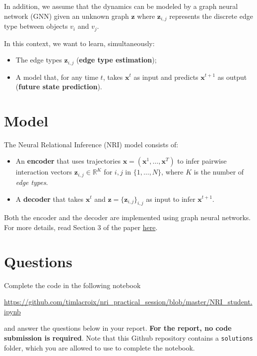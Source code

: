 \documentclass[a4paper, 11pt]{article}
\begin{document}
In addition,  we assume that the dynamics can be modeled by a graph neural network (GNN) given an unknown graph $\mathbf{z}$ where $\mathbf{z}_{i,j}$ represents the discrete edge type between objects $v_i$ and $v_j$.

In this context, we want to learn, simultaneously:

\begin{itemize}
	\item The edge types $\mathbf{z}_{i,j}$ (\textbf{edge type estimation}); 
	\item A model that, for any time $t$, takes $\mathbf{x}^t$ as input and predicts $\mathbf{x}^{t+1}$ as output (\textbf{future state prediction}).
\end{itemize}

\section{Model}

The Neural Relational Inference (NRI) model consists of:

\begin{itemize}
	\item An \textbf{encoder} that uses trajectories $\mathbf{x} = (\mathbf{x}^1, \ldots, \mathbf{x}^T)$ to infer pairwise interaction vectors $\mathbf{z}_{i, j} \in \mathbb{R}^K$ for $i, j$ in $\{1, \ldots, N \}$, where $K$ is the number of \emph{edge types}.
	\item A \textbf{decoder} that takes $\mathbf{x}^t$ and $\mathbf{z} = \{\mathbf{z}_{i, j}\}_{i,j}$ as input to infer $\mathbf{x}^{t+1}$.
\end{itemize}

Both the encoder and the decoder are implemented using graph neural networks. For more details, read Section 3 of the paper \href{https://arxiv.org/pdf/1802.04687.pdf}{here}. \\


\section{Questions}

Complete the code in the following notebook

\url{https://github.com/timlacroix/nri_practical_session/blob/master/NRI_student.ipynb}

and answer the questions below in your report. \textbf{For the report, no code submission is required}. Note that this Github repository contains a \texttt{solutions} folder, which you are allowed to use to complete the notebook. 
\end{document}
